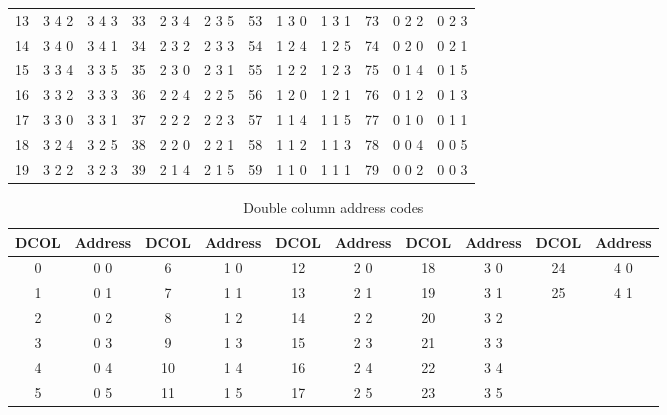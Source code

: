 \begin{table}[p]
{\begin{center}
\begin{tabular}{ccc|ccc|ccc|ccc}
	13  &	3   4	2   &	3   4	3   &	33  &	2   3	4   &	2   3	5   &	53  &	1   3	0   &	1   3	1   &	73  &	0   2	2   &	0   2	3   \\
	14  &	3   4	0   &	3   4	1   &	34  &	2   3	2   &	2   3	3   &	54  &	1   2	4   &	1   2	5   &	74  &	0   2	0   &	0   2	1   \\
	15  &	3   3	4   &	3   3	5   &	35  &	2   3	0   &	2   3	1   &	55  &	1   2	2   &	1   2	3   &	75  &	0   1	4   &	0   1	5   \\
	16  &	3   3	2   &	3   3	3   &	36  &	2   2	4   &	2   2	5   &	56  &	1   2	0   &	1   2	1   &	76  &	0   1	2   &	0   1	3   \\
	17  &	3   3	0   &	3   3	1   &	37  &	2   2	2   &	2   2	3   &	57  &	1   1	4   &	1   1	5   &	77  &	0   1	0   &	0   1	1   \\
	18  &	3   2	4   &	3   2	5   &	38  &	2   2	0   &	2   2	1   &	58  &	1   1	2   &	1   1	3   &	78  &	0   0	4   &	0   0	5   \\
	19  &	3   2	2   &	3   2	3   &	39  &	2   1	4   &	2   1	5   &	59  &	1   1	0   &	1   1	1   &	79  &	0   0	2   &	0   0	3   \\
	\bottomrule
 \end{tabular}
    \end{center}
}
 \label{tab:pixeladdr}
 \end{table}

\begin{table}[p]
\caption{Double column address codes}
{\footnotesize
    \begin{center}
\begin{tabular}{cc|cc|cc|cc|cc}
	\toprule
	DCOL & Address & DCOL & Address & DCOL & Address & DCOL & Address &DCOL & Address \\
	\midrule
	0   &	0   0	&   6	&   1	0   &	12  &	2   0	&   18	&   3	0   &	24  &	4   0	\\
	1   &	0   1	&   7	&   1	1   &	13  &	2   1	&   19	&   3	1   &	25  &	4   1	\\
	2   &	0   2	&   8	&   1	2   &	14  &	2   2	&   20	&   3	2   &	    &		\\
	3   &	0   3	&   9	&   1	3   &	15  &	2   3	&   21	&   3	3   &	    &		\\
	4   &	0   4	&   10	&   1	4   &	16  &	2   4	&   22	&   3	4   &	    &		\\
	5   &	0   5	&   11	&   1	5   &	17  &	2   5	&   23	&   3	5   &	    &		\\
	\bottomrule
 \end{tabular}
    \end{center}
}
 \label{tab:columnaddr}
 \end{table}

